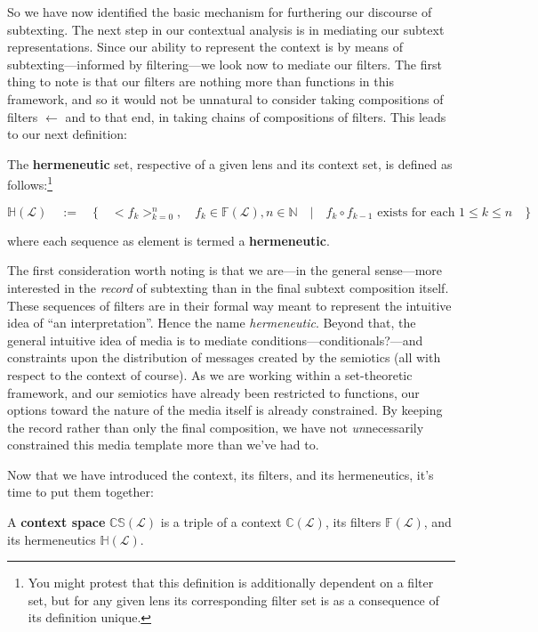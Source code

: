\documentclass[twoside]{article}
\newenvironment{definition}[1][Definition]{\begin{trivlist}
\item[\hskip \labelsep {\bfseries #1:}]}{\end{trivlist}}
\begin{document}
So we have now identified the basic mechanism for furthering our discourse of subtexting. The next step in our contextual
analysis is in mediating our subtext representations. Since our ability to represent the context is by means of
subtexting---informed by filtering---we look now to mediate our filters. The first thing to note is that our filters
are nothing more than functions in this framework, and so it would not be unnatural to consider taking compositions
of filters $ \leftarrow $ and to that end, in taking chains of compositions of filters. This leads to our next definition:

\begin{definition}[Context Space - Media]

The {\bfseries hermeneutic} set, respective of a given lens and its context set, is defined as
follows:\footnote{You might protest that this definition is additionally dependent on a filter set,
but for any given lens its corresponding filter set is as a consequence of its definition unique.}

$$ \mathbb{H}(\mathcal{L})\quad:=\quad\{\quad <f_k\!>_{k=0}^n,\quad f_k\in\mathbb{F}(\mathcal{L}),
	n\in\mathbb{N}\quad|\quad f_k\circ f_{k-1}\mbox{ exists for each }1\le k\le n\quad\} $$

where each sequence as element is termed a {\bfseries hermeneutic}.

\end{definition}

The first consideration worth noting is that we are---in the general sense---more interested in the \emph{record}
of subtexting than in the final subtext composition itself. These sequences of filters are in their formal way meant
to represent the intuitive idea of ``an interpretation''. Hence the name \emph{hermeneutic}. Beyond that, the general
intuitive idea of media is to mediate conditions---conditionals?---and constraints upon the distribution of messages
created by the semiotics (all with respect to the context of course). As we are working within a set-theoretic framework,
and our semiotics have already been restricted to functions, our options toward the nature of the media itself is already
constrained. By keeping the record rather than only the final composition, we have not \emph{un}necessarily constrained
this media template more than we've had to.

Now that we have introduced the context, its filters, and its hermeneutics, it's time to put them together:

\begin{definition}[Context Space]

A {\bfseries context space} $ \mathbb{CS}(\mathcal{L}) $ is a triple of a context $ \mathbb{C}(\mathcal{L}) $,
its filters $ \mathbb{F}(\mathcal{L}) $, and its hermeneutics $ \mathbb{H}(\mathcal{L}) $.

\end{definition}
\end{document}
